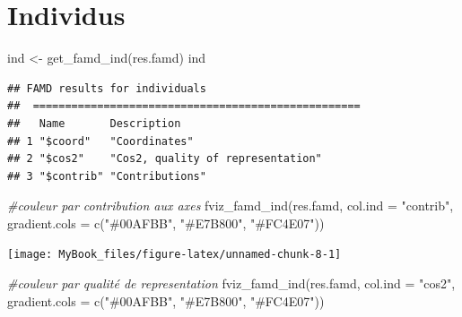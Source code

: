\documentclass[
  12pt,
  american,
  a4paper,
  extrafontsizes,onecolumn,openright
  ]{memoir}
\newenvironment{Shaded}{\begin{snugshade}}{\end{snugshade}}
\newcommand{\AttributeTok}[1]{\textcolor[rgb]{0.77,0.63,0.00}{#1}}
\newcommand{\CommentTok}[1]{\textcolor[rgb]{0.56,0.35,0.01}{\textit{#1}}}
\newcommand{\FunctionTok}[1]{\textcolor[rgb]{0.00,0.00,0.00}{#1}}
\newcommand{\NormalTok}[1]{#1}
\newcommand{\OtherTok}[1]{\textcolor[rgb]{0.56,0.35,0.01}{#1}}
\newcommand{\StringTok}[1]{\textcolor[rgb]{0.31,0.60,0.02}{#1}}
\begin{document}
\normalsize

\hypertarget{individus}{%
\section{Individus}\label{individus}}

\scriptsize

\begin{Shaded}
\begin{Highlighting}[]
\NormalTok{ind }\OtherTok{\textless{}{-}} \FunctionTok{get\_famd\_ind}\NormalTok{(res.famd)}
\NormalTok{ind}
\end{Highlighting}
\end{Shaded}

\begin{verbatim}
## FAMD results for individuals 
##  ===================================================
##   Name       Description                      
## 1 "$coord"   "Coordinates"                    
## 2 "$cos2"    "Cos2, quality of representation"
## 3 "$contrib" "Contributions"
\end{verbatim}

\begin{Shaded}
\begin{Highlighting}[]
\CommentTok{\#couleur par contribution aux axes}
\FunctionTok{fviz\_famd\_ind}\NormalTok{(res.famd, }\AttributeTok{col.ind =} \StringTok{"contrib"}\NormalTok{,}
             \AttributeTok{gradient.cols =} \FunctionTok{c}\NormalTok{(}\StringTok{"\#00AFBB"}\NormalTok{, }\StringTok{"\#E7B800"}\NormalTok{, }\StringTok{"\#FC4E07"}\NormalTok{))}
\end{Highlighting}
\end{Shaded}

\begin{center}\texttt{[image: MyBook\_files/figure-latex/unnamed-chunk-8-1]} \end{center}

\begin{Shaded}
\begin{Highlighting}[]
\CommentTok{\#couleur par qualité de representation}
\FunctionTok{fviz\_famd\_ind}\NormalTok{(res.famd, }\AttributeTok{col.ind =} \StringTok{"cos2"}\NormalTok{,}
             \AttributeTok{gradient.cols =} \FunctionTok{c}\NormalTok{(}\StringTok{"\#00AFBB"}\NormalTok{, }\StringTok{"\#E7B800"}\NormalTok{, }\StringTok{"\#FC4E07"}\NormalTok{))}
\end{Highlighting}
\end{Shaded}
\end{document}

